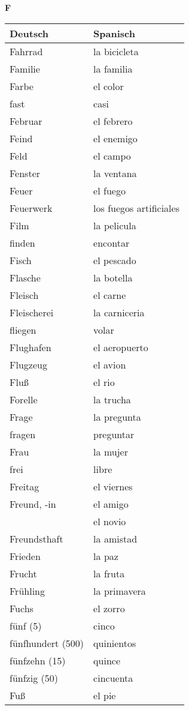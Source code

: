 \begin{flushright}\begin{Huge}\textbf{F}\end{Huge}\end{flushright}

\begin{longtable}{p{} p{}} 
\textbf{Deutsch}     & \textbf{Spanisch}                                       \\ \hline
\hline
\endhead %
Fahrrad & la bicicleta\\
Familie & la familia\\
Farbe & el color\\
fast & casi \\
Februar & el febrero\\
Feind & el enemigo\\
Feld & el campo\\
Fenster & la ventana\\
Feuer & el fuego\\
Feuerwerk & los fuegos artificiales\\
Film & la pelicula\\
finden & encontar\\
Fisch & el pescado\\
Flasche & la botella\\
Fleisch & el carne \\
Fleischerei & la carniceria\\
fliegen & volar\\
Flughafen & el aeropuerto\\
Flugzeug & el avion\\
Fluß & el rio\\
Forelle & la trucha \\
Frage & la pregunta\\
fragen & preguntar\\
Frau & la mujer \\
frei & libre\\
Freitag & el viernes\\
Freund, -in & el amigo\\
~ & el novio\\
Freundsthaft & la amistad\\
Frieden & la paz\\
Frucht & la fruta\\
Frühling & la primavera\\
Fuchs & el zorro\\
fünf (5) & cinco \\
fünfhundert (500) & quinientos\\
fünfzehn (15) & quince\\
fünfzig (50) & cincuenta\\
Fuß & el pie\\
\end{longtable}
